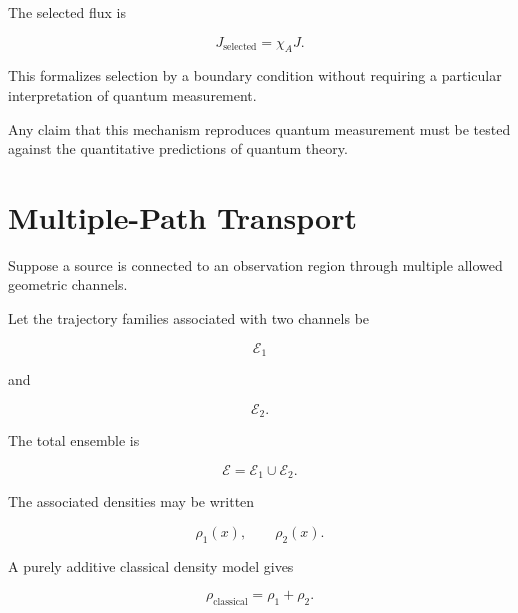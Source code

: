 \documentclass[12pt,oneside]{book}
\begin{document}
The selected flux is

\begin{equation}
    J_{\mathrm{selected}}
    =
    \chi_A J.
    \label{eq:selected-boundary-flux}
\end{equation}

This formalizes selection by a boundary condition without
requiring a particular interpretation of quantum measurement.

Any claim that this mechanism reproduces quantum measurement
must be tested against the quantitative predictions of quantum
theory.


\section{Multiple-Path Transport}
\label{sec:multiple-path-transport}

Suppose a source is connected to an observation region through
multiple allowed geometric channels.

Let the trajectory families associated with two channels be

\begin{equation}
    \mathscr{E}_1
\end{equation}

and

\begin{equation}
    \mathscr{E}_2.
\end{equation}

The total ensemble is

\begin{equation}
    \mathscr{E}
    =
    \mathscr{E}_1
    \cup
    \mathscr{E}_2.
    \label{eq:two-path-ensemble}
\end{equation}

The associated densities may be written

\begin{equation}
    \rho_1(x),
    \qquad
    \rho_2(x).
\end{equation}

A purely additive classical density model gives

\begin{equation}
    \rho_{\mathrm{classical}}
    =
    \rho_1
    +
    \rho_2.
    \label{eq:classical-density-addition}
\end{equation}
\end{document}
